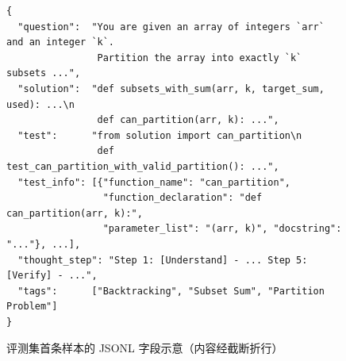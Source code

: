 \begin{figure}[!htb]
\begin{footnotesize}
\begin{verbatim}
{
  "question":  "You are given an array of integers `arr` and an integer `k`.
                Partition the array into exactly `k` subsets ...",
  "solution":  "def subsets_with_sum(arr, k, target_sum, used): ...\n
                def can_partition(arr, k): ...",
  "test":      "from solution import can_partition\n
                def test_can_partition_with_valid_partition(): ...",
  "test_info": [{"function_name": "can_partition",
                 "function_declaration": "def can_partition(arr, k):",
                 "parameter_list": "(arr, k)", "docstring": "..."}, ...],
  "thought_step": "Step 1: [Understand] - ... Step 5: [Verify] - ...",
  "tags":      ["Backtracking", "Subset Sum", "Partition Problem"]
}
\end{verbatim}
\end{footnotesize}
\vspace{-2mm}
\caption{评测集首条样本的 JSONL 字段示意（内容经截断折行）}
\label{fig:ch3-sample}
\end{figure}
